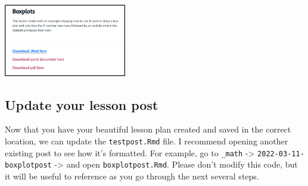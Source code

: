 \documentclass[
]{article}
\begin{document}
\includegraphics[width=0.4\textwidth,height=\textheight]{images/guide-img3.png}

\hypertarget{update-your-lesson-post}{%
\subsection{Update your lesson post}\label{update-your-lesson-post}}

Now that you have your beautiful lesson plan created and saved in the
correct location, we can update the \texttt{testpost.Rmd} file. I
recommend opening another existing post to see how it's formatted. For
example, go to \texttt{\_math} -\textgreater{}
\texttt{2022-03-11-boxplotpost} -\textgreater{} and open
\texttt{boxplotpost.Rmd}. Please don't modify this code, but it will be
useful to reference as you go through the next several steps.
\end{document}
